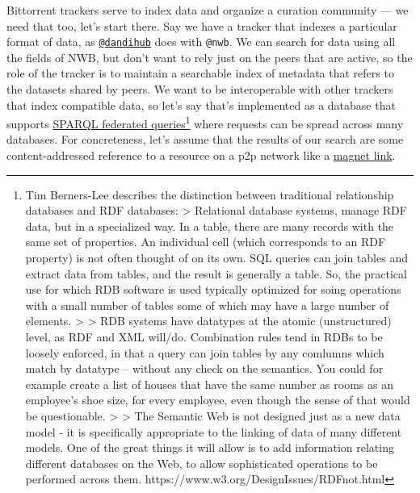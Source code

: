 \documentclass[10pt]{article}
\begin{document}
\begin{multicols}{2}
Bittorrent trackers serve to index data and organize a curation
community --- we need that too, let's start there. Say we have a tracker
that indexes a particular format of data, as
\href{https://hub.dandiarchive.org}{\texttt{@dandihub}} does with
\texttt{@nwb}. We can search for data using all the fields of NWB, but
don't want to rely just on the peers that are active, so the role of the
tracker is to maintain a searchable index of metadata that refers to the
datasets shared by peers. We want to be interoperable with other
trackers that index compatible data, so let's say that's implemented as
a database that supports
\href{https://www.w3.org/TR/sparql11-federated-query/}{SPARQL federated
queries}\footnote{Tim Berners-Lee describes the distinction between
  traditional relationship databases and RDF databases: \textgreater{}
  Relational database systems, manage RDF data, but in a specialized
  way. In a table, there are many records with the same set of
  properties. An individual cell (which corresponds to an RDF property)
  is not often thought of on its own. SQL queries can join tables and
  extract data from tables, and the result is generally a table. So, the
  practical use for which RDB software is used typically optimized for
  soing operations with a small number of tables some of which may have
  a large number of elements. \textgreater{} \textgreater{} RDB systems
  have datatypes at the atomic (unstructured) level, as RDF and XML
  will/do. Combination rules tend in RDBs to be loosely enforced, in
  that a query can join tables by any comlumns which match by datatype
  -- without any check on the semantics. You could for example create a
  list of houses that have the same number as rooms as an employee's
  shoe size, for every employee, even though the sense of that would be
  questionable. \textgreater{} \textgreater{} The Semantic Web is not
  designed just as a new data model - it is specifically appropriate to
  the linking of data of many different models. One of the great things
  it will allow is to add information relating different databases on
  the Web, to allow sophisticated operations to be performed across
  them. https://www.w3.org/DesignIssues/RDFnot.html} where requests can
be spread across many databases. For concreteness, let's assume that the
results of our search are some content-addressed reference to a resource
on a p2p network like a
\href{https://en.wikipedia.org/wiki/Magnet_URI_scheme}{magnet link}.


\end{multicols}
\end{document}

